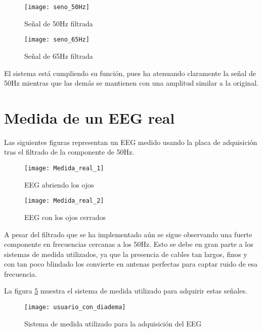 \begin{figure} [H]
    \centering
    \texttt{[image: seno\_50Hz]}
    \caption{Señal de 50Hz filtrada}
    \label{fig:seno_50Hz}
\end{figure}

\begin{figure} [H]
    \centering
    \texttt{[image: seno\_65Hz]}
    \caption{Señal de 65Hz filtrada}
    \label{fig:seno_65Hz}
\end{figure}

El sistema está cumpliendo su función, pues ha atenuando claramente la señal de 50Hz mientras que las demás se mantienen con una amplitud similar a la original.

\clearpage

\section{Medida de un EEG real\label{Resultados_EEG}}

Las siguientes figuras representan un EEG medido usando la placa de adquisición tras el filtrado de la componente de 50Hz.

\begin{figure} [H]
    \centering
    \texttt{[image: Medida\_real\_1]}
    \caption{EEG abriendo los ojos}
    \label{fig:Medida_real_1}
\end{figure}

\begin{figure} [H]
    \centering
    \texttt{[image: Medida\_real\_2]}
    \caption{EEG con los ojos cerrados}
    \label{fig:Medida_real_2}
\end{figure}

A pesar del filtrado que se ha implementado aún se sigue observando una fuerte componente en frecuencias cercanas a los 50Hz. Esto se debe en gran parte a los sistemas de medida utilizados, ya que la presencia de cables tan largos, finos y con tan poco blindado los convierte en antenas perfectas para captar ruido de esa frecuencia. 

La figura \ref{fig:Sistema_medida} muestra el sistema de medida utilizado para adquirir estas señales.

\begin{figure} [h]
    \centering
    \texttt{[image: usuario\_con\_diadema]}
    \caption{Sistema de medida utilizado para la adquisición del EEG}
    \label{fig:Sistema_medida}
\end{figure}

